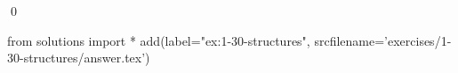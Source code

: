 
\begin{ex}
  \label{ex:1-30-structures}
  
  \qed
\end{ex}
\begin{python0}
from solutions import *
add(label="ex:1-30-structures",
    srcfilename='exercises/1-30-structures/answer.tex')
\end{python0}

